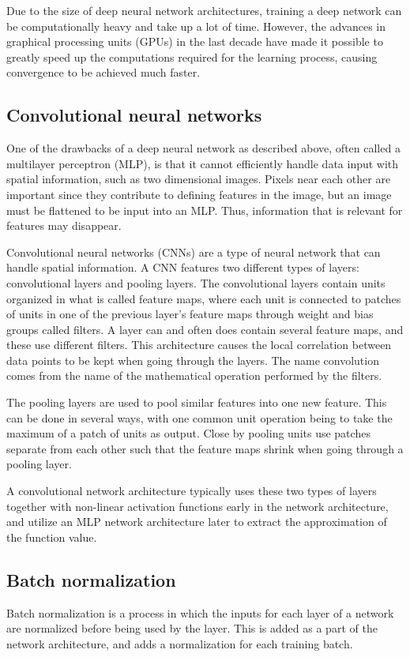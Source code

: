 \documentclass{kththesis}
\begin{document}
Due to the size of deep neural network architectures, training a deep network can be computationally heavy and take up a lot of time. However, the advances in graphical processing units (GPUs) in the last decade have made it possible to greatly speed up the computations required for the learning process, causing convergence to be achieved much faster. \parencite{lecun2015deep}

\subsection{Convolutional neural networks}
One of the drawbacks of a deep neural network as described above, often called a multilayer perceptron (MLP), is that it cannot efficiently handle data input with spatial information, such as two dimensional images. Pixels near each other are important since they contribute to defining features in the image, but an image must be flattened to be input into an MLP. Thus, information that is relevant for features may disappear. 

Convolutional neural networks (CNNs) are a type of neural network that can handle spatial information. A CNN features two different types of layers: convolutional layers and pooling layers. The convolutional layers contain units organized in what is called feature maps, where each unit is connected to patches of units in one of the previous layer's feature maps through weight and bias groups called filters. A layer can and often does contain several feature maps, and these use different filters. This architecture causes the local correlation between data points to be kept when going through the layers. The name convolution comes from the name of the mathematical operation performed by the filters. \parencite{lecun2015deep}

The pooling layers are used to pool similar features into one new feature. This can be done in several ways, with one common unit operation being to take the maximum of a patch of units as output. Close by pooling units use patches separate from each other such that the feature maps shrink when going through a pooling layer. \parencite{lecun2015deep}

A convolutional network architecture typically uses these two types of layers together with non-linear activation functions early in the network architecture, and utilize an MLP network architecture later to extract the approximation of the function value. \parencite{lecun2015deep}

\subsection{Batch normalization}
Batch normalization is a process in which the inputs for each layer of a network are normalized before being used by the layer. This is added as a part of the network architecture, and adds a normalization for each training batch.
\end{document}
